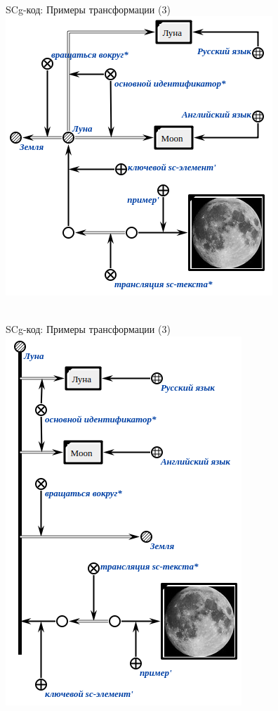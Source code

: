 \begin{frame}{\\SCg-код: Примеры трансформации (3)}
	\topline
	\justifying
	\vspace*{\fill}\\
	\vspace{10mm}
	\centering
	\includegraphics[scale=0.5]{./figures/intro/scg/examples/scg_examples_transf_3_2.png}
\end{frame}

\begin{frame}{\\SCg-код: Примеры трансформации (3)}
	\topline
	\justifying
	\vspace*{\fill}\\
	\vspace{10mm}
	\centering
	\includegraphics[scale=0.5]{./figures/intro/scg/examples/scg_examples_transf_3_3.png}
\end{frame}

